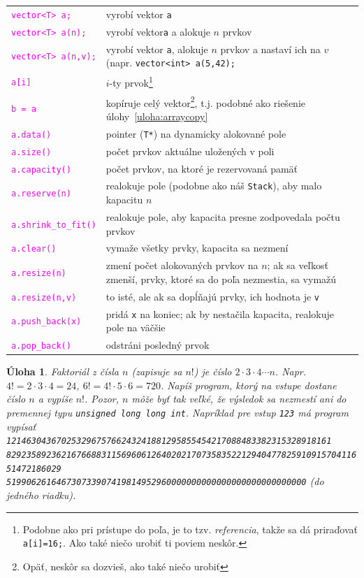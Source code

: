 \documentclass[10pt]{article}
\def\prg{\lstinline}
\newtheorem{uloha}{Úloha}
\begin{document}
\def\xx#1{\textcolor{magenta}{\prg!#1!}}
\begin{tabularx}{\textwidth}{lX}\toprule
  \xx{vector<T> a;} & vyrobí vektor {\tt a}\\
  \xx{vector<T> a(n);} & vyrobí vektor{\tt a} a alokuje $n$ prvkov\\
  \xx{vector<T> a(n,v);}& vyrobí vektor {\tt a}, alokuje $n$ prvkov a 
              nastaví ich na $v$ (napr. \prg!vector<int> a(5,42);!\\\midrule
  \xx{a[i]} & $i$-ty prvok\footnote{Podobne ako pri prístupe do poľa, je to tzv. {\em referencia}, takže sa dá priraďovať \prg!a[i]=16;!. Ako také niečo urobiť ti poviem neskôr.}\\\midrule 
  \xx{b = a} & 
  kopíruje celý vektor\footnote{Opäť, neskôr sa dozvieš, ako také niečo urobiť}, t.j.
   podobné ako riešenie úlohy~\ref{uloha:arraycopy}\\\midrule
  \xx{a.data()} & pointer (\prg!T*!) na dynamicky alokované pole\\\midrule
  \xx{a.size()} & počet prvkov aktuálne uložených v poli\\
  \xx{a.capacity()} & počet prvkov, na ktoré je rezervovaná pamäť\\\midrule
  \xx{a.reserve(n)} & realokuje pole (podobne ako náš {\tt Stack}), aby malo 
        kapacitu $n$\\\midrule
  \xx{a.shrink_to_fit()} & realokuje pole, aby kapacita
  presne zodpovedala počtu prvkov \\\midrule
  \xx{a.clear()} & vymaže všetky prvky, kapacita sa nezmení \\\midrule
  \xx{a.resize(n)} & zmení počet alokovaných prvkov na $n$; ak sa veľkosť zmenší,
   prvky, ktoré sa do poľa nezmestia, sa vymažú \\ 
   \xx{a.resize(n,v)} & to isté, ale ak sa dopĺňajú prvky, ich hodnota je {\tt v}\\\midrule
  \xx{a.push_back(x)} & pridá {\tt x} na koniec; ak by nestačila kapacita, realokuje 
  pole na väčšie\\
  \xx{a.pop_back()} & odstráni posledný prvok\\\bottomrule
\end{tabularx}

\begin{uloha}
  \label{uloha:faktorial}
  Faktoriál z čísla $n$ (zapisuje sa $n!$) je číslo $2\cdot3\cdot4\cdots n$. Napr.
$4!=2\cdot3\cdot4=24$, $6!=4!\cdot5\cdot6=720$. Napíš program, ktorý
na vstupe dostane číslo $n$ a vypíše $n!$. Pozor, $n$ môže byť tak veľké,
že výsledok sa nezmestí ani do premennej typu \prg!unsigned long long int!.
  Napríklad pre vstup {\tt 123} má program vypísať {\tt
  12146304367025329675766243241881295855454217088483382315328918161
  829235892362167668831156960612640202170735835221294047782591091570411651472186029
  519906261646730733907419814952960000000000000000000000000000} (do jedného riadku).
\end{uloha}
\end{document}
